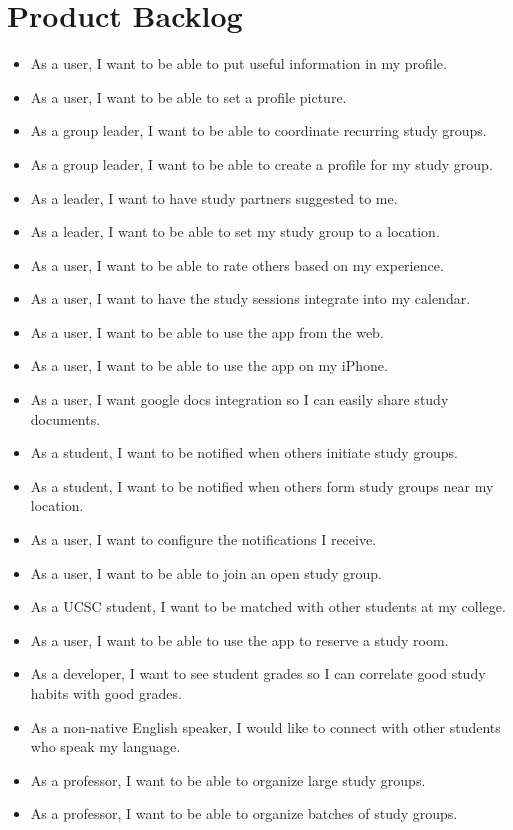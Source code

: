 \documentclass[10pt]{article}
\begin{document}
    \section{Product Backlog}
    \begin{itemize}
        \item As a user, I want to be able to put useful information in my profile.
        \item As a user, I want to be able to set a profile picture.
        \item As a group leader, I want to be able to coordinate recurring study groups.
        \item As a group leader, I want to be able to create a profile for my study group.
        \item As a leader, I want to have study partners suggested to me.
        \item As a leader, I want to be able to set my study group to a location.
        \item As a user, I want to be able to rate others based on my experience.
        \item As a user, I want to have the study sessions integrate into my calendar.
        \item As a user, I want to be able to use the app from the web.
        \item As a user, I want to be able to use the app on my iPhone.
        \item As a user, I want google docs integration so I can easily share study documents.
        \item As a student, I want to be notified when others initiate study groups.
        \item As a student, I want to be notified when others form study groups near my location.
        \item As a user, I want to configure the notifications I receive.
        \item As a user, I want to be able to join an open study group.
        \item As a UCSC student, I want to be matched with other students at my college.
        \item As a user, I want to be able to use the app to reserve a study room.
        \item As a developer, I want to see student grades so I can correlate good study habits with good grades.
        \item As a non-native English speaker, I would like to connect with other students who speak my language.
        \item As a professor, I want to be able to organize large study groups.
        \item As a professor, I want to be able to organize batches of study groups.
    \end{itemize}    
\end{document}
